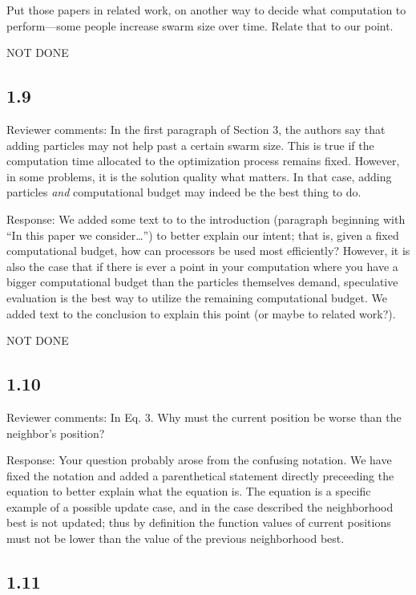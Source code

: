 \documentclass[onecolumn, 12pt]{article}
\begin{document}
Put those papers in related work, on another way to decide what computation to
perform---some people increase swarm size over time.  Relate that to our point.

NOT DONE

\subsection*{1.9}

Reviewer comments: In the first paragraph of Section 3, the authors say that
adding particles may not help past a certain swarm size. This is true if the
computation time allocated to the optimization process remains fixed. However,
in some problems, it is the solution quality what matters. In that case, adding
particles \emph{and} computational budget may indeed be the best thing to do.

Response: We added some text to to the introduction (paragraph beginning with
``In this paper we consider\ldots'') to better explain our intent; that is,
given a fixed computational budget, how can processors be used most
efficiently?  However, it is also the case that if there is ever a point in
your computation where you have a bigger computational budget than the
particles themselves demand, speculative evaluation is the best way to utilize
the remaining computational budget.  We added text to the conclusion to explain
this point (or maybe to related work?).

NOT DONE

\subsection*{1.10}

Reviewer comments: In Eq. 3. Why must the current position be worse than the
neighbor's position?

Response: Your question probably arose from the confusing notation.  We have
fixed the notation and added a parenthetical statement directly preceeding the
equation to better explain what the equation is.  The equation is a specific
example of a possible update case, and in the case described the neighborhood
best is not updated; thus by definition the function values of current
positions must not be lower than the value of the previous neighborhood best.

\subsection*{1.11}
\end{document}
